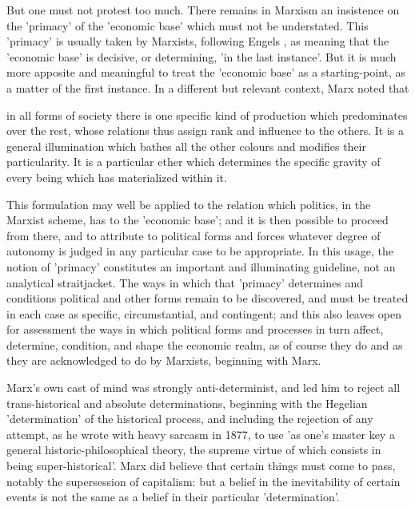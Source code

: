 But one must not protest too much. There remains in Marxism an insistence on the 'primacy' of the 'economic base' which must not be understated. This 'primacy' is usually taken by Marxists, following Engels , as meaning that the 'economic base' is decisive, or determining, 'in the last instance'. But it is much more apposite and meaningful to treat the 'economic base' as a starting-point, as a matter of the first instance. In a different but relevant context, Marx noted that
\begin{displayquote}
    in all forms of society there is one specific kind of production which predominates over the rest, whose relations thus assign rank and influence to the others. It is a general illumination which bathes all the other colours and modifies their particularity. It is a particular ether which determines the specific gravity of every being which has materialized within it.
\end{displayquote}

 This formulation may well be applied to the relation which politics, in the Marxist scheme, has to the 'economic base'; and it is then possible to proceed from there, and to attribute to political forms and forces whatever degree of autonomy is judged in any particular case to be appropriate. In this usage, the notion of 'primacy' constitutes an important and illuminating guideline, not an analytical straitjacket. The ways in which that 'primacy' determines and conditions political and other forms remain to be discovered, and must be treated in each case as specific, circumstantial, and contingent; and this also leaves open for assessment the ways in which political forms and processes in turn affect, determine, condition, and shape the economic realm, as of course they do and as they are acknowledged to do by Marxists, beginning with Marx.

Marx's own cast of mind was strongly anti-determinist, and led him to reject all trans-historical and absolute determinations, beginning with the Hegelian 'determination' of the historical process, and including the rejection of any attempt, as he wrote with heavy sarcasm in 1877, to use 'as one's master key a general historic\hyp{}philosophical theory, the supreme virtue of which consists in being super-historical'. Marx did believe that certain things must come to pass, notably the supersession of capitalism: but a belief in the inevitability of certain events is not the same as a belief in their particular 'determination'.

